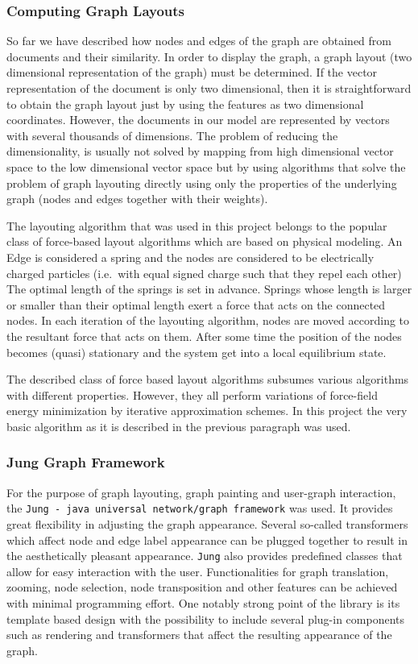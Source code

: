 \subsubsection{Computing Graph Layouts}
So far we have described how nodes and edges of the graph are obtained from documents and their
similarity. In order to display the graph, a graph layout (two dimensional representation of the
graph) must be determined. If the vector representation of the document is only two dimensional,
then it is straightforward to obtain the graph layout just by using the features as two dimensional
coordinates. However, the documents in our model are represented by vectors with several thousands
of dimensions. The problem of reducing the dimensionality, is usually not solved by mapping
from high dimensional vector space to the low dimensional vector space but by using algorithms that
solve the problem of graph layouting directly using only the properties of the underlying graph
(nodes and edges together with their weights).

The layouting algorithm that was used in this project belongs to the popular class of force-based
layout algorithms which are based on physical modeling. An Edge is considered a spring and
the nodes are considered to be electrically charged particles (i.e.\ with equal signed charge such
that they repel each other) The optimal length of the springs is set in advance. Springs whose
length is larger or smaller than their optimal length exert a force that acts on the connected
nodes. In each iteration of the layouting algorithm, nodes are moved according to the resultant
force
that acts on them. After some time the position of the nodes becomes (quasi) stationary and the
system get into a local equilibrium state.

The described class of force based layout algorithms subsumes various algorithms with different
properties. However, they all perform variations of force-field energy minimization by iterative
approximation schemes. In this project the very basic algorithm as it is described in the previous
paragraph was used.

\subsubsection{Jung Graph Framework}
For the purpose of graph layouting, graph painting and user-graph interaction, the
\texttt{Jung}\texttt{ - java universal network/graph
framework}
was used. It provides great flexibility in adjusting the graph appearance. Several so-called
transformers which affect node and edge label appearance can be plugged together to result in the
aesthetically pleasant appearance. \texttt{Jung} also provides predefined classes that allow for
easy interaction with the user. Functionalities for graph translation, zooming, node selection, node
transposition and other features can be achieved with minimal programming effort. One notably
strong point of the library is its template based design with the possibility to include several
plug-in components such as rendering and transformers that affect the resulting appearance of the
graph.

